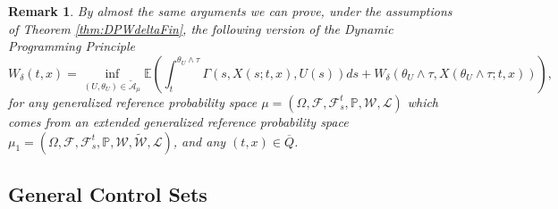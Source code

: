 \documentclass[amscd,amssymb,11pt]{article}
\newtheorem{remark}[theorem]{Remark}
\numberwithin{theorem}{section}
\numberwithin{equation}{section}
\begin{document}
\begin{remark}\label{rem:ImprovDPFinite}
By almost the same arguments we can prove, under the assumptions of Theorem \ref{thm:DPWdeltaFin}, the following version of the Dynamic Programming Principle
\begin{equation*}
W_\delta(t,x)=\inf_{(U,\theta_{U})\in\widetilde{\mathcal{A}}_{\mu}}\mathbb{E}\left(\int_{t}^{\theta_{U}\wedge\tau}\Gamma\left(s,X(s;t,x),U(s)\right)ds+W_{\delta}\left(\theta_{U}\wedge\tau,X(\theta_{U}\wedge\tau;t,x)\right)\right),
\end{equation*}
for any generalized reference probability space $\mu=(\Omega,\mathscr{F},\mathscr{F}_{s}^{t},\mathbb{P},\mathcal{W},\mathcal{L})$ which comes from an extended generalized reference probability space $\mu_{1}=(\Omega,\mathscr{F},\mathscr{F}_{s}^{t},\mathbb{P},\mathcal{W},\widetilde{\mathcal{W}},\mathcal{L})$, and any $(t,x)\in\overline{Q}$.
\end{remark}


\subsection{General Control Sets}\label{Subsec:DPVisSolGenCtrl}
\end{document}
